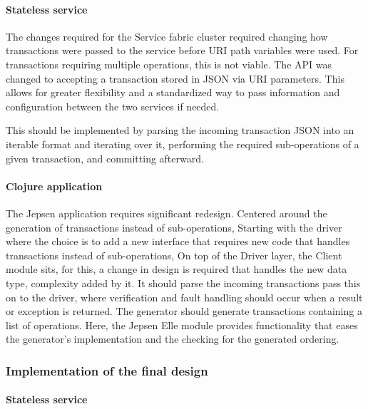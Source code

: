 \documentclass[a4paper,10pt,titlepage]{report}
\begin{document}
\paragraph*{Stateless service}

The changes required for the Service fabric cluster required changing how transactions were passed to the service before URI path variables were used. For transactions requiring multiple operations, this is not viable. The API was changed to accepting a transaction stored in JSON via URI parameters. This allows for greater flexibility and a standardized way to pass information and configuration between the two services if needed. 

This should be implemented by parsing the incoming transaction JSON into an iterable format and iterating over it, performing the required sub-operations of a given transaction, and committing afterward.

\paragraph*{Clojure application}

The Jepsen application requires significant redesign. Centered around the generation of transactions instead of sub-operations, Starting with the driver where the choice is to add a new interface that requires new code that handles transactions instead of sub-operations, On top of the Driver layer, the Client module sits, for this, a change in design is required that handles the new data type, complexity added by it. It should parse the incoming transactions pass this on to the driver, where verification and fault handling should occur when a result or exception is returned. The generator should generate transactions containing a list of operations. Here, the Jepsen Elle module provides functionality that eases the generator's implementation and the checking for the generated ordering.

\subsubsection{Implementation of the final design}

\paragraph*{Stateless service}
\end{document}
